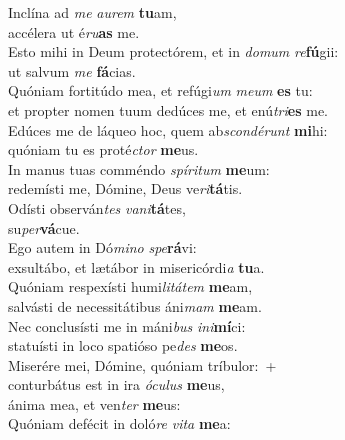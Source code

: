\evenverse Inclína ad \textit{me} \textit{au}\textit{rem} \textbf{tu}am,~\*\\
\evenverse accélera ut é\textit{ru}\textbf{as} me.\\
\oddverse Esto mihi in Deum protectórem, et in \textit{do}\textit{mum} \textit{re}\textbf{fú}gii:~\*\\
\oddverse ut salvum \textit{me} \textbf{fá}cias.\\
\evenverse Quóniam fortitúdo mea, et refúgi\textit{um} \textit{me}\textit{um} \textbf{es} tu:~\*\\
\evenverse et propter nomen tuum dedúces me, et enú\textit{tri}\textbf{es} me.\\
\oddverse Edúces me de láqueo hoc, quem ab\textit{scon}\textit{dé}\textit{runt} \textbf{mi}hi:~\*\\
\oddverse quóniam tu es proté\textit{ctor} \textbf{me}us.\\
\evenverse In manus tuas comméndo \textit{spí}\textit{ri}\textit{tum} \textbf{me}um:~\*\\
\evenverse redemísti me, Dómine, Deus ve\textit{ri}\textbf{tá}tis.\\
\oddverse Odísti observán\textit{tes} \textit{va}\textit{ni}\textbf{tá}tes,~\*\\
\oddverse su\textit{per}\textbf{vá}cue.\\
\evenverse Ego autem in Dó\textit{mi}\textit{no} \textit{spe}\textbf{rá}vi:~\*\\
\evenverse exsultábo, et lætábor in misericórdi\textit{a} \textbf{tu}a.\\
\oddverse Quóniam respexísti humi\textit{li}\textit{tá}\textit{tem} \textbf{me}am,~\*\\
\oddverse salvásti de necessitátibus áni\textit{mam} \textbf{me}am.\\
\evenverse Nec conclusísti me in máni\textit{bus} \textit{i}\textit{ni}\textbf{mí}ci:~\*\\
\evenverse statuísti in loco spatióso pe\textit{des} \textbf{me}os.\\
\oddverse Miserére mei, Dómine, quóniam tríbulor:~+\\
\oddverse  conturbátus est in ira \textit{ó}\textit{cu}\textit{lus} \textbf{me}us,~\*\\
\oddverse ánima mea, et ven\textit{ter} \textbf{me}us:\\
\evenverse Quóniam defécit in doló\textit{re} \textit{vi}\textit{ta} \textbf{me}a:~\*\\
